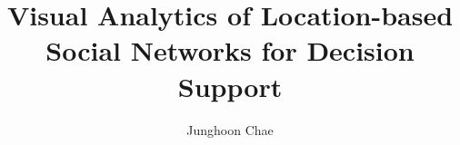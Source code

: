 \documentclass[ece,dissertation]{puthesis}
\title{Visual Analytics of Location-based Social Networks for Decision Support}
\author{Junghoon Chae}{Chae, Junghoon}
\begin{document}
\volume











%

%



\appendices
%
%
%
%
%
%



\end{document}
